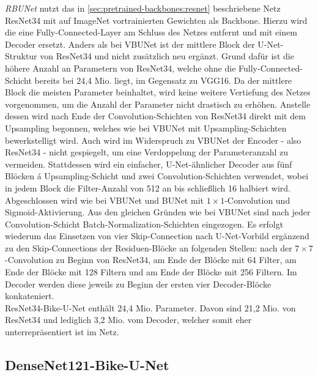 \textit{\ac{RBUNet}} nutzt das in \autoref{sec:pretrained-backbones:resnet} beschriebene Netz ResNet34 
mit auf ImageNet vortrainierten Gewichten als Backbone. 
Hierzu wird die eine Fully-Connected-Layer am Schluss des Netzes entfernt und mit einem Decoder ersetzt. 
Anders als bei \ac{VBUNet} ist der mittlere Block der U-Net-Struktur von ResNet34 
und nicht zusätzlich neu ergänzt. Grund dafür ist die höhere Anzahl an Parametern 
von ResNet34, welche ohne die Fully-Connected-Schicht bereits bei 24,4 Mio. liegt, im Gegensatz zu VGG16. 
Da der mittlere Block die meisten Parameter beinhaltet, wird keine weitere Vertiefung des Netzes vorgenommen,
um die Anzahl der Parameter nicht drastisch zu erhöhen. Anstelle dessen wird nach Ende der Convolution-Schichten von 
ResNet34 direkt mit dem Upsampling begonnen, welches wie bei \ac{VBUNet} mit Upsampling-Schichten 
bewerkstelligt wird. Auch wird im Widerspruch zu \ac{VBUNet} der Encoder - also ResNet34 - nicht gespiegelt, 
um eine Verdoppelung der Parameteranzahl zu vermeiden. Stattdessen wird ein einfacher, U-Net-ähnlicher Decoder
aus fünf Blöcken á Upsampling-Schicht und zwei Convolution-Schichten verwendet, wobei in jedem Block 
die Filter-Anzahl von 512 an bis schließlich 16 halbiert wird. Abgeschlossen wird wie bei \ac{VBUNet} und
\ac{BUNet} mit $1\times 1$-Convolution und Sigmoid-Aktivierung. Aus den gleichen Gründen wie bei \ac{VBUNet}
sind nach jeder Convolution-Schicht Batch-Normalization-Schichten eingezogen. 
Es erfolgt wiederum das Einsetzen von vier Skip-Connection nach U-Net-Vorbild ergänzend zu den 
Skip-Connections der Residuen-Blöcke an folgenden Stellen: 
nach der $7\times 7$-Convolution zu Beginn von ResNet34, 
am Ende der Blöcke mit 64 Filter, am Ende der Blöcke mit 128 Filtern 
und am Ende der Blöcke mit 256 Filtern. Im Decoder werden diese jeweils 
zu Beginn der ersten vier Decoder-Blöcke konkateniert. \\ 
ResNet34-Bike-U-Net enthält 24,4 Mio. Parameter. Davon sind 21,2 Mio. von ResNet34 und lediglich 3,2 Mio. 
vom Decoder, welcher somit eher unterrepräsentiert ist im Netz.  

\subsection{DenseNet121-Bike-U-Net}

